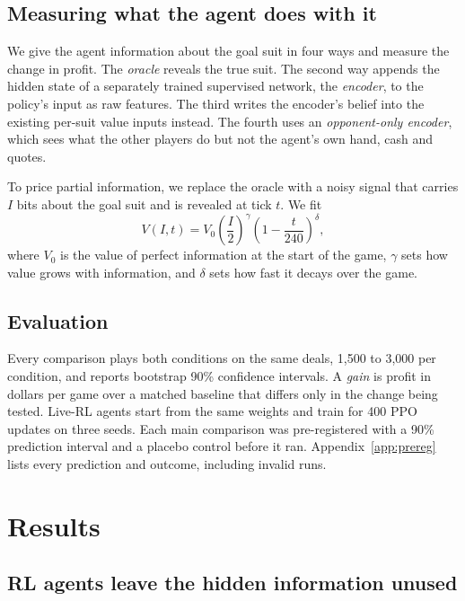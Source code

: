 \documentclass{article}
\begin{document}
\subsection{Measuring what the agent does with it}
We give the agent information about the goal suit in four ways and measure the change in profit. The \emph{oracle} reveals the true suit. The second way appends the hidden state of a separately trained supervised network, the \emph{encoder}, to the policy's input as raw features. The third writes the encoder's belief into the existing per-suit value inputs instead. The fourth uses an \emph{opponent-only encoder}, which sees what the other players do but not the agent's own hand, cash and quotes.

To price partial information, we replace the oracle with a noisy signal that carries $I$ bits about the goal suit and is revealed at tick $t$. We fit
\begin{equation}
  V(I, t) = V_0 \left(\frac{I}{2}\right)^{\gamma} \left(1 - \frac{t}{240}\right)^{\delta},
  \label{eq:voi}
\end{equation}
where $V_0$ is the value of perfect information at the start of the game, $\gamma$ sets how value grows with information, and $\delta$ sets how fast it decays over the game.

\subsection{Evaluation}
Every comparison plays both conditions on the same deals, 1,500 to 3,000 per condition, and reports bootstrap 90\% confidence intervals. A \emph{gain} is profit in dollars per game over a matched baseline that differs only in the change being tested. Live-RL agents start from the same weights and train for 400 PPO updates on three seeds. Each main comparison was pre-registered with a 90\% prediction interval and a placebo control before it ran. Appendix~\ref{app:prereg} lists every prediction and outcome, including invalid runs.

\section{Results}
\label{sec:results}

\subsection{RL agents leave the hidden information unused}
\label{sec:gap}
\end{document}
